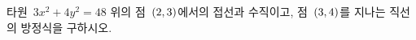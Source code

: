 타원~$3x^2+4y^2=48$ 위의 점~$(2{,}\mkern3mu\mathopen{}3)$에서의 접선과 수직이고, 점~$(3{,}\mkern3mu\mathopen{}4)$를 지나는 직선의 방정식을 구하시오.

